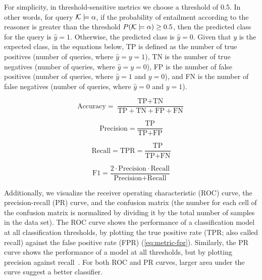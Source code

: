 For simplicity, in threshold-sensitive metrics we choose a threshold of 0.5.
In other words, for query $\mathcal{K} \models \alpha$, if the probability of entailment according to the reasoner is greater than the threshold $P(\mathcal{K} \models \alpha) \geq 0.5$, then the predicted class for the query is $\hat y = 1$.
Otherwise, the predicted class is $\hat y = 0$.
Given that $y$ is the expected class, in the equations below, TP is defined as the number of true positives (number of queries, where $\hat y = y = 1$), TN is the number of true negatives (number of queries, where $\hat y = y = 0$), FP is the number of false positives (number of queries, where $\hat y = 1$ and $y = 0$), and FN is the number of false negatives (number of queries, where $\hat y = 0$ and $y = 1$).

\begin{equation}
\label{eq:metric-accuracy}
\text{Accuracy} = \frac{\text{TP} + \text{TN}}{\text{TP} + \text{TN} + \text{FP} + \text{FN}}
\end{equation}

\begin{equation}
\label{eq:metric-precision}
\text{Precision} = \frac{\text{TP}}{\text{TP} + \text{FP}}
\end{equation}

\begin{equation}
\label{eq:metric-recall}
\text{Recall} = \text{TPR} = \frac{\text{TP}}{\text{TP} + \text{FN}}
\end{equation}

\begin{equation}
\label{eq:metric-f1}
\text{F1} = \frac{2 \cdot \text{Precision} \cdot \text{Recall}}{\text{Precision} + \text{Recall}}
\end{equation}

Additionally, we visualize the receiver operating characteristic (ROC) curve, the precision-recall (PR) curve, and the confusion matrix (the number for each cell of the confusion matrix is normalized by dividing it by the total number of samples in the data set).
The ROC curve shows the performance of a classification model at all classification thresholds, by plotting the true positive rate (TPR; also called recall) against  the false positive rate (FPR) (\autoref{eq:metric-fpr}).
Similarly, the PR curve shows the performance of a model at all thresholds, but by plotting precision against recall~\cite{saito_precision-recall_2015}.
For both ROC and PR curves, larger area under the curve suggest a better classifier.


